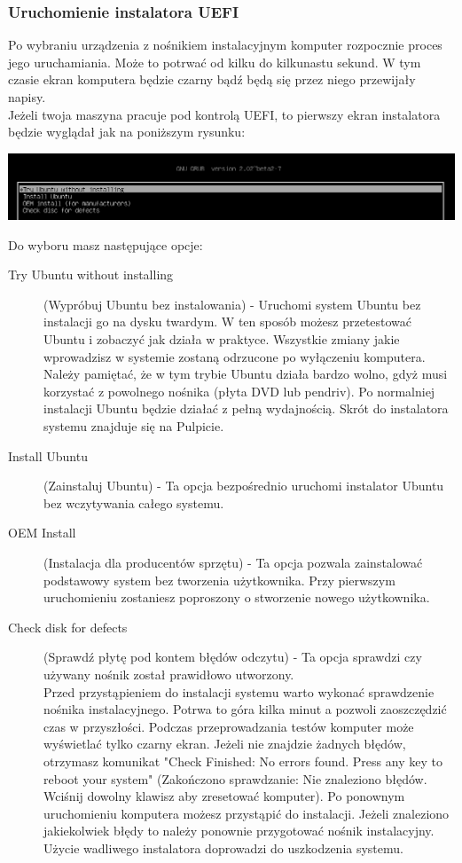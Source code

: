 \subsubsection{Uruchomienie instalatora UEFI}
Po wybraniu urządzenia z nośnikiem instalacyjnym komputer rozpocznie proces jego uruchamiania. Może to potrwać od kilku do kilkunastu sekund. W tym czasie ekran komputera będzie czarny bądź będą się przez niego przewijały napisy.\\
Jeżeli twoja maszyna pracuje pod kontrolą UEFI, to pierwszy ekran instalatora będzie wyglądał jak na poniższym rysunku:
\begin{center}
        \includegraphics[width=\linewidth]{images/instalacja_UEFI_boot.png}
\end{center}
Do wyboru masz następujące opcje:
\begin{description}
\item[Try Ubuntu without installing](Wypróbuj Ubuntu bez instalowania) - Uruchomi system Ubuntu bez instalacji go na dysku twardym. W ten sposób możesz przetestować Ubuntu i zobaczyć jak działa w praktyce. Wszystkie zmiany jakie wprowadzisz w systemie zostaną odrzucone po wyłączeniu komputera. Należy pamiętać, że w tym trybie Ubuntu działa bardzo wolno, gdyż musi korzystać z powolnego nośnika (płyta DVD lub pendriv). Po normalniej instalacji Ubuntu będzie działać z pełną wydajnością. Skrót do instalatora systemu znajduje się na Pulpicie.
\item[Install Ubuntu](Zainstaluj Ubuntu) - Ta opcja bezpośrednio uruchomi instalator Ubuntu bez wczytywania całego systemu.
\item[OEM Install](Instalacja dla producentów sprzętu) - Ta opcja pozwala zainstalować podstawowy system bez tworzenia użytkownika. Przy pierwszym uruchomieniu zostaniesz poproszony o stworzenie nowego użytkownika.
\item[Check disk for defects](Sprawdź płytę pod kontem błędów odczytu) - Ta opcja sprawdzi czy używany nośnik został prawidłowo utworzony.\\
Przed przystąpieniem do instalacji systemu warto wykonać sprawdzenie nośnika instalacyjnego. Potrwa to góra kilka minut a pozwoli zaoszczędzić czas w przyszłości. Podczas przeprowadzania testów komputer może wyświetlać tylko czarny ekran. Jeżeli nie znajdzie żadnych błędów, otrzymasz komunikat "Check Finished: No errors found. Press any key to reboot your system" (Zakończono sprawdzanie: Nie znaleziono błędów. Wciśnij dowolny klawisz aby zresetować komputer). Po ponownym uruchomieniu komputera możesz przystąpić do instalacji. Jeżeli znaleziono jakiekolwiek błędy to należy ponownie przygotować nośnik instalacyjny. Użycie wadliwego instalatora doprowadzi do uszkodzenia systemu. 
\end{description}
